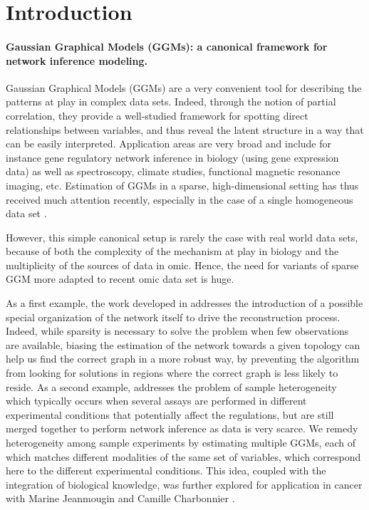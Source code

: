 \section{Introduction}

\paragraph*{Gaussian Graphical Models (GGMs): a canonical framework
  for network inference modeling.} Gaussian Graphical Models (GGMs)
\citep{1996_Book_Lauritzen,whittaker1990graphical} are a very
convenient tool for describing the patterns at play in complex data
sets.  Indeed, through the notion of partial correlation, they provide
a well-studied framework for spotting direct relationships between
variables, and thus reveal the latent structure in a way that can be
easily interpreted. Application areas are very broad and include for
instance gene regulatory network inference in biology (using gene
expression data) as well as spectroscopy, climate studies, functional
magnetic resonance imaging, etc.  Estimation of GGMs in a sparse,
high-dimensional setting has thus received much attention recently,
especially in the case of a single homogeneous data set
\citep{2006_AS_Meinshausen,2007_BS_Friedman,2008_JMLR_Banerjee,2010_JMLR_Yuan,2011_AS_Cai}.

However, this simple canonical setup is rarely the case with real
world data sets, because of both the complexity of the mechanism at
play in biology and the multiplicity of the sources of data in
omic. Hence, the need for variants of sparse GGM more adapted to
recent omic data set is huge.

As a first example, the work developed in \cite{2009_EJS_Chiquet,
  2009_BI_Chiquet} addresses the introduction of a possible special
organization of the network itself to drive the reconstruction
process.  Indeed, while sparsity is necessary to solve the problem
when few observations are available, biasing the estimation of the
network towards a given topology can help us find the correct graph in
a more robust way, by preventing the algorithm from looking for
solutions in regions where the correct graph is less likely to
reside. As a second example, \cite{2011_SC_Chiquet} addresses the
problem of sample heterogeneity which typically occurs when several
assays are performed in different experimental conditions that
potentially affect the regulations, but are still merged together to
perform network inference as data is very scarce.  We remedy
heterogeneity among sample experiments by estimating multiple GGMs,
each of which matches different modalities of the same set of
variables, which correspond here to the different experimental
conditions. This idea, coupled with the integration of biological
knowledge, was further explored for application in cancer with Marine
Jeanmougin and Camille Charbonnier \citep{2014_inbook_jeanmougin}.

